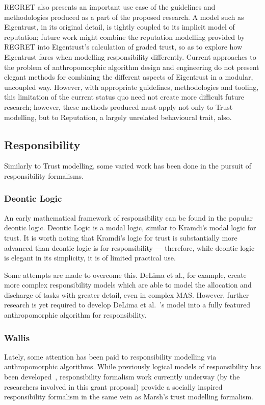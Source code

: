 REGRET also presents an important use case of the guidelines and methodologies produced as a part of the proposed research. A model such as Eigentrust, in its original detail, is tightly coupled to its implicit model of reputation; future work might combine the reputation modelling provided by REGRET into Eigentrust's calculation of graded trust, so as to explore how Eigentrust fares when modelling responsibility differently. Current approaches to the problem of anthropomorphic algorithm design and engineering do not present elegant methods for combining the different aspects of Eigentrust in a modular, uncoupled way. However, with appropriate guidelines, methodologies and tooling, this limitation of the current status quo need not create more difficult future research; however, these methods produced must apply not only to Trust modelling, but to Reputation, a largely unrelated behavioural trait, also.\par

\subsection{Responsibility}
Similarly to Trust modelling, some varied work has been done in the pursuit of responsibility formalisms.

\subsubsection*{Deontic Logic}

An early mathematical framework of responsibility can be found in the popular deontic logic\cite{deontic-logic}. Deontic Logic is a modal logic, similar to Kramdi's modal logic for trust.\cite{kramdi} It is worth noting that Kramdi's logic for trust is substantially more advanced than deontic logic is for responsibility --- therefore, while deontic logic is elegant in its simplicity, it is of limited practical use.\par

Some attempts are made to overcome this. DeLima et al., for example, create more complex responsibility models which are able to model the allocation and discharge of tasks with greater detail, even in complex MAS.\cite{DeLima2008} However, further research is yet required to develop DeLima et al.~'s model into a fully featured anthropomorphic algorithm for responsibility.

\subsubsection*{Wallis}
Lately, some attention has been paid to responsibility modelling via anthropomorphic algorithms.\cite{wallis2017} While previously logical models of responsibility has been developed~\cite{berreby2015modelling}, responsibility formalism work currently underway (by the researchers involved in this grant proposal) provide a socially inspired responsibility formalism in the same vein as Marsh's trust modelling formalism.\par

